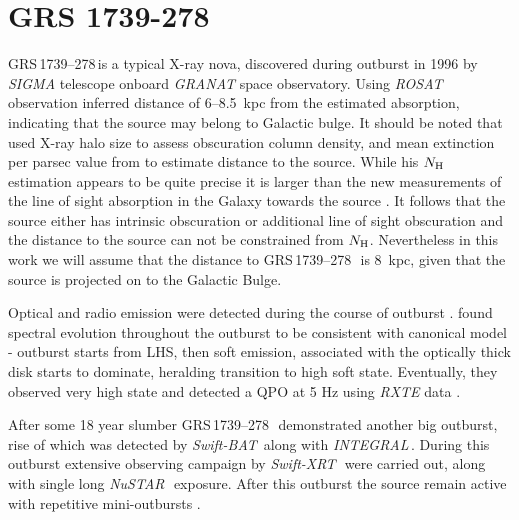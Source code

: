 \documentclass[a4paper,fleqn,usenatbib]{mnras}
\def\grs{{GRS\,1739--278\,}}
\def\swiftx{{\em Swift-XRT\,}}
\def\swiftb{{\em Swift-BAT\,}}
\def\nustar{{\em NuSTAR\,}}
\def\integral{{\em INTEGRAL\,}}
\begin{document}
\section{GRS 1739-278}

\grs is a typical X-ray nova, discovered during outburst in 1996  \citep{paul96} by {\it SIGMA} \citep{paul91} telescope onboard {\it GRANAT} space observatory.
Using {\it ROSAT} observation \citet{greiner96} inferred distance of 6--8.5~kpc from the estimated absorption, indicating that the source may belong to Galactic bulge. 
It should be noted that \citet{greiner96} used X-ray halo size to assess obscuration column density, and mean extinction per parsec value from \citep{1973asqu.book.....A} to estimate distance to the source. 
While his $N_{\rm H}$ estimation appears to be quite precise it is larger than the new measurements of the line of sight absorption in the Galaxy towards the source \citep{1990ARA&A..28..215D, 2005A&A...440..775K, 2006A&A...453..635M, 2014A&A...566A.120S}. 
It follows that the source either has intrinsic obscuration or additional line of sight obscuration  and the distance to the source can not be constrained from $N_{\rm H}$.
Nevertheless in this work we will assume that the distance to \grs\ is 8~kpc, given that the source is projected on to the Galactic Bulge.  

Optical and radio emission were detected during the course of outburst \citep{hjellming96,marti97}. 
\citet{borozdin98} found spectral evolution throughout the outburst to be consistent with canonical model - outburst starts from LHS, then soft emission, associated with the optically thick disk starts to dominate, heralding transition to high soft state. 
Eventually, they observed very high state and detected a QPO at 5 Hz using {\it RXTE} data \citep{borozdin00, 2001MNRAS.328..451W}.

After some 18 year slumber \grs\ demonstrated another big outburst, rise of which was detected by \swiftb \citep{krimm14_atel} along with \integral \citep{filippova14}. 
During this outburst extensive observing campaign by \swiftx\, were carried out, along with single long \nustar\ exposure. 
After this outburst the source remain active with repetitive mini-outbursts \citep{mereminskiy17grs,yan17}.
\end{document}
